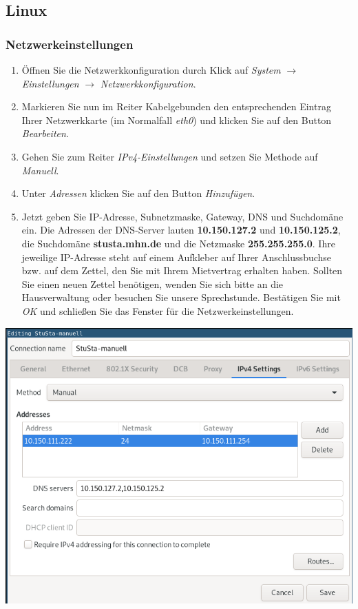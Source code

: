 \documentclass[a4paper,12pt]{scrartcl}
\begin{document}
\pagebreak

\subsection{Linux}

\subsubsection*{Netzwerkeinstellungen}

\begin{minipage}{0.57\textwidth}
\begin{enumerate}
	\item Öffnen Sie die Netzwerkkonfiguration durch Klick auf \emph{System} $\rightarrow$ \emph{Einstellungen} $\rightarrow$ \emph{Netzwerkkonfiguration}.
	\item Markieren Sie nun im Reiter Kabelgebunden den entsprechenden Eintrag Ihrer Netzwerkkarte (im Normalfall \emph{eth0}) und klicken Sie auf den Button \emph{Bearbeiten}.
	\item Gehen Sie zum Reiter \emph{IPv4-Einstellungen} und setzen Sie Methode auf \emph{Manuell}.
	\item Unter \emph{Adressen} klicken Sie auf den Button \emph{Hinzufügen}.
	\item Jetzt geben Sie IP-Adresse, Subnetzmaske, Gateway, DNS und Suchdomäne ein. Die Adressen der DNS-Server lauten \textbf{10.150.127.2} und \textbf{10.150.125.2}, die Suchdomäne \textbf{stusta.mhn.de} und die Netzmaske \textbf{255.255.255.0}. Ihre jeweilige IP-Adresse steht auf einem Aufkleber auf Ihrer Anschlussbuchse bzw. auf dem Zettel, den Sie mit Ihrem Mietvertrag erhalten haben. Sollten Sie einen neuen Zettel benötigen, wenden Sie sich bitte an die Hausverwaltung oder besuchen Sie unsere Sprechstunde. Bestätigen Sie mit \emph{OK} und schließen Sie das Fenster für die Netzwerkeinstellungen.
\end{enumerate}
\end{minipage}
\hfill
\begin{minipage}{0.4\textwidth}
\includegraphics[width=\linewidth]{Bilder/IP_Ubuntu_neu}
\end{minipage}
\end{document}
